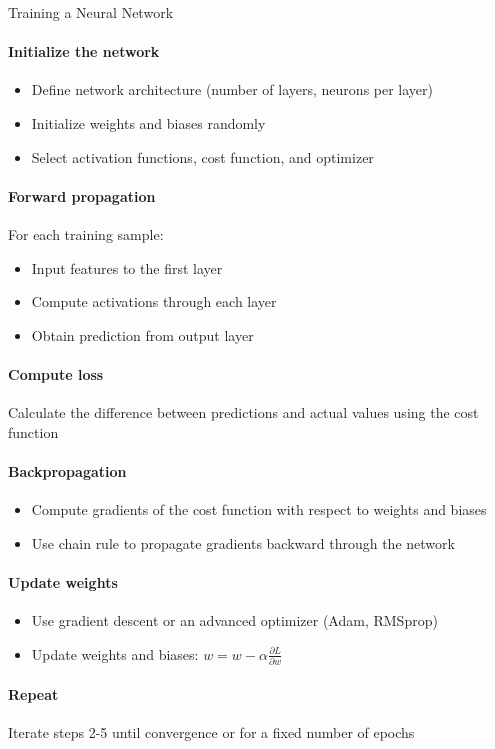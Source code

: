 \begin{KR}{Training a Neural Network}\\
\paragraph{Initialize the network}
\begin{itemize}
    \item Define network architecture (number of layers, neurons per layer)
    \item Initialize weights and biases randomly
    \item Select activation functions, cost function, and optimizer
\end{itemize}

\paragraph{Forward propagation}
For each training sample:
\begin{itemize}
    \item Input features to the first layer
    \item Compute activations through each layer
    \item Obtain prediction from output layer
\end{itemize}

\paragraph{Compute loss}
Calculate the difference between predictions and actual values using the cost function

\paragraph{Backpropagation}
\begin{itemize}
    \item Compute gradients of the cost function with respect to weights and biases
    \item Use chain rule to propagate gradients backward through the network
\end{itemize}

\paragraph{Update weights}
\begin{itemize}
    \item Use gradient descent or an advanced optimizer (Adam, RMSprop)
    \item Update weights and biases: $w = w - \alpha \frac{\partial L}{\partial w}$
\end{itemize}

\paragraph{Repeat}
Iterate steps 2-5 until convergence or for a fixed number of epochs
\end{KR}

